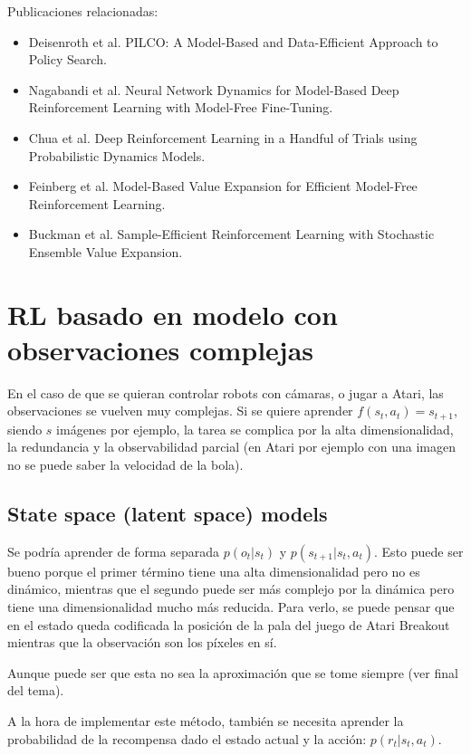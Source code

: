 Publicaciones relacionadas:
\begin{itemize}
\item Deisenroth et al. PILCO: A Model-Based and Data-Efficient Approach to Policy Search.
\item Nagabandi et al. Neural Network Dynamics for Model-Based Deep Reinforcement Learning with Model-Free Fine-Tuning.
\item Chua et al. Deep Reinforcement Learning in a Handful of Trials using Probabilistic Dynamics Models.
\item Feinberg et al. Model-Based Value Expansion for Efficient Model-Free Reinforcement Learning.
\item Buckman et al. Sample-Efficient Reinforcement Learning with Stochastic Ensemble Value Expansion.
\end{itemize}

\section{RL basado en modelo con observaciones complejas}%
\label{sec:rl_basado_en_modelo_con_observaciones_complejas}

En el caso de que se quieran controlar robots con cámaras, o jugar a Atari, las observaciones se
vuelven muy complejas. Si se quiere aprender $f(s_t,a_t)=s_{t+1}$, siendo  $s$ imágenes por
ejemplo, la tarea se complica por la alta dimensionalidad, la redundancia y la observabilidad
parcial (en Atari por ejemplo con una imagen no se puede saber la velocidad de la bola).

\subsection{State space (latent space) models}%
\label{sub:state_space_latent_space_models}

Se podría aprender de forma separada $p(o_t|s_t)$ y  $p(s_{t+1}|s_t,a_t)$. Esto puede ser bueno
porque el primer término tiene una alta dimensionalidad pero no es dinámico, mientras que el
segundo puede ser más complejo por la dinámica pero tiene una dimensionalidad
mucho más reducida. Para verlo, se puede pensar que en el estado queda codificada la
posición de la pala del juego de Atari Breakout mientras que la observación son los píxeles en
sí.

Aunque puede ser que esta no sea la aproximación que se tome siempre (ver final del tema).

A la hora de implementar este método, también se necesita aprender la probabilidad de la
recompensa dado el estado actual y la acción: $p(r_t|s_t,a_t)$.


